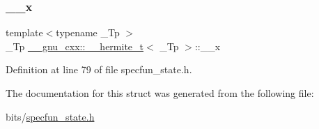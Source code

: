 \subsubsection{\texorpdfstring{\+\_\+\+\_\+x}{\_\_x}}
{\footnotesize\ttfamily template$<$typename \+\_\+\+Tp $>$ \\
\+\_\+\+Tp \hyperlink{struct____gnu__cxx_1_1____hermite__t}{\+\_\+\+\_\+gnu\+\_\+cxx\+::\+\_\+\+\_\+hermite\+\_\+t}$<$ \+\_\+\+Tp $>$\+::\+\_\+\+\_\+x}



Definition at line 79 of file specfun\+\_\+state.\+h.



The documentation for this struct was generated from the following file\+:\begin{DoxyCompactItemize}
\item 
bits/\hyperlink{specfun__state_8h}{specfun\+\_\+state.\+h}\end{DoxyCompactItemize}
